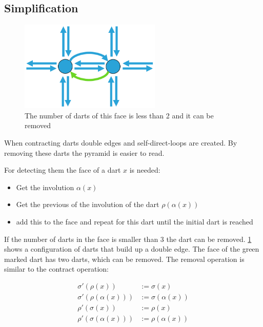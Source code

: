 \documentclass[12pt]{article}
\begin{document}

\subsection{Simplification} %
\label{sub:simplification}

\begin{figure}[tb]
  \centering
  \includegraphics[width=0.6\textwidth]{img/face.pdf}
  \caption{The number of darts of this face is less than 2 and it can be removed}
  \label{fig:faces}
\end{figure}

When contracting darts double edges and self-direct-loops are created. By removing these darts the pyramid is easier to read.

For detecting them the face of a dart \(x\) is needed:

\begin{itemize}
  \item Get the involution \(\alpha(x)\)
  \item Get the previous of the involution of the dart \(\rho(\alpha(x))\)
  \item add this to the face and repeat for this dart until the initial dart is reached
\end{itemize}

If the number of darts in the face is smaller than 3 the dart can be removed.
\cref{fig:faces} shows a configuration of darts that build up a double edge. The face of the green marked dart has two darts, which can be removed.
The removal operation is similar to the contract operation:

\begin{align}
  \sigma'(\rho(x))   &:= \sigma(x)                \\
  \sigma'(\rho(\alpha(x)))  &:= \sigma(\alpha(x)) \\
  \rho'(\sigma(x))   &:= \rho(x)                  \\
  \rho'(\sigma(\alpha(x)))  &:= \rho(\alpha(x))
\end{align}
\end{document}
